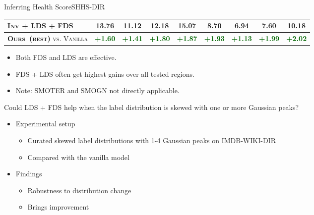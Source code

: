 \begin{frame}{Inferring Health Score}{SHHS-DIR}
\begin{table}[tb]
\begin{center}
{\begin{tabular}{l|cccc|cccc}
					\textsc{Inv} + \textbf{\textsc{LDS}} + \textbf{\textsc{FDS}} & \textbf{13.76} & \textbf{11.12} & \textbf{12.18}  & \textbf{15.07}     & \textbf{8.70}     & 6.94     & \textbf{7.60}      & \textbf{10.18} \\ \midrule\midrule
					\textsc{\textbf{Ours~(best)} vs. Vanilla}   & \textcolor{darkgreen}{\textbf{+1.60}} & \textcolor{darkgreen}{\textbf{+1.41}} & \textcolor{darkgreen}{\textbf{+1.80}} & \textcolor{darkgreen}{\textbf{+1.87}} & \textcolor{darkgreen}{\textbf{+1.93}} & \textcolor{darkgreen}{\textbf{+1.13}} & \textcolor{darkgreen}{\textbf{+1.99}} & \textcolor{darkgreen}{\textbf{+2.02}} \\
					\bottomrule[1.5pt]
				\end{tabular}
			}
		\end{center}
	\end{table}
	\begin{itemize}
		\item Both FDS and LDS are effective.
		\item FDS + LDS often get highest gains over all tested regions.
		\item Note: SMOTER and SMOGN not directly applicable.
	\end{itemize}
\end{frame}

\begin{frame}{Could LDS + FDS help when the label distribution is skewed with one or more Gaussian peaks?}
	\begin{itemize}\setlength\itemsep{1.5em}
		\item Experimental setup
		\begin{itemize}
			\item Curated skewed label distributions with 1-4 Gaussian peaks on IMDB-WIKI-DIR
			\item Compared with the vanilla model
		\end{itemize}
		\item Findings
		\begin{itemize}
			\item Robustness to distribution change
			\item Brings improvement
		\end{itemize}
	\end{itemize}
\end{frame}

